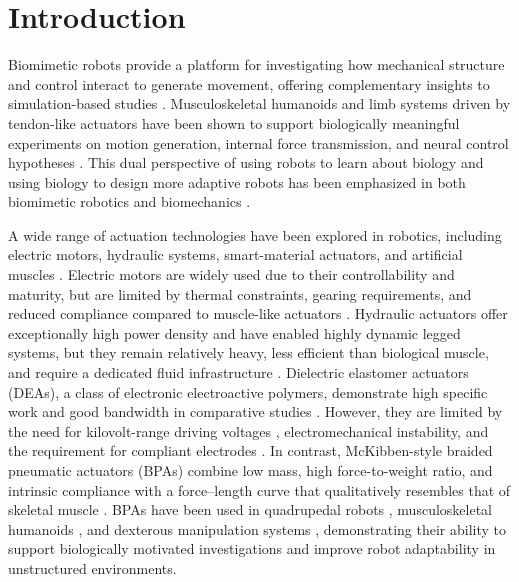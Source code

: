 \documentclass[actuators,article,accept,pdftex,moreauthors]{Definitions/mdpi}
\begin{document}
\section{Introduction}\label{introduction}
Biomimetic robots provide a platform for investigating how mechanical structure and control interact to generate movement, offering complementary insights to simulation-based studies \citep{andrews_general_1985, millard_flexing_2013, arnold_model_2010}. Musculoskeletal humanoids and limb systems driven by tendon-like actuators have been shown to support biologically meaningful experiments on motion generation, internal force transmission, and neural control hypotheses \citep{asano_design_2017, asano_musculoskeletal_2019, hitzmann_anthropomorphic_2018, liu_robotic_2018, chen_realizing_2019}. This dual perspective of using robots to learn about biology and using biology to design more adaptive robots has been emphasized in both biomimetic robotics and biomechanics \citep{ijspeert_amphibious_2020, asano_design_2017}.

A wide range of actuation technologies have been explored in robotics, including electric motors, hydraulic systems, smart-material actuators, and artificial muscles \citep{he_mechanism_2020, liang_comparative_2020}. Electric motors are widely used due to their controllability and maturity, but are limited by thermal constraints, gearing requirements, and reduced compliance compared to muscle-like actuators \citep{veale_towards_2016, suzumori_trends_2018}. Hydraulic actuators offer exceptionally high power density and have enabled highly dynamic legged systems, but they remain relatively heavy, less efficient than biological muscle, and require a dedicated fluid infrastructure \citep{suzumori_trends_2018}. Dielectric elastomer actuators (DEAs), a class of electronic electroactive polymers, demonstrate high specific work and good bandwidth in comparative studies \citep{liang_comparative_2020}. However, they are limited by the need for kilovolt-range driving voltages \citep{madden_artificial_2004}, electromechanical instability, and the requirement for compliant electrodes \citep{liang_comparative_2020}. In contrast, McKibben-style braided pneumatic actuators (BPAs) combine low mass, high force-to-weight ratio, and intrinsic compliance with a force–length curve that qualitatively resembles that of skeletal muscle \citep{liang_comparative_2020, hunt_modeling_2017}. BPAs have been used in quadrupedal robots \citep{aschenbeck_design_2006, hunt_modeling_2017}, musculoskeletal humanoids \citep{asano_design_2017, hitzmann_anthropomorphic_2018}, and dexterous manipulation systems \citep{chen_realizing_2019}, demonstrating their ability to support biologically motivated investigations and improve robot adaptability in unstructured environments.
\end{document}
